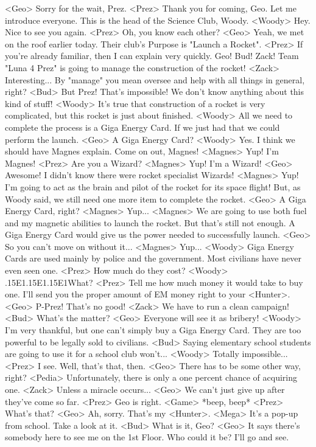 <Geo> Sorry for the wait, Prez. 
<Prez> Thank you for coming, Geo. 
Let me introduce everyone. This is the head of the Science Club, Woody. 
<Woody> Hey. Nice to see you again. 
<Prez> Oh, you know each other? 
<Geo> Yeah, we met on the roof earlier today. 
Their club's Purpose is "Launch a Rocket". 
<Prez> If you're already familiar, then I can explain very quickly. 
Geo! Bud! Zack! 
Team "Luna 4 Prez" is going to manage the construction of the rocket! 
<Zack> Interesting... 
By "manage" you mean oversee and help with all things in general, right? 
<Bud> But Prez! That's impossible! 
We don't know anything about this kind of stuff! 
<Woody> It's true that construction of a rocket is very 
complicated, but this rocket is just about finished. 
<Woody> All we need to complete the process is a Giga Energy Card. 
If we just had that we could perform the launch. 
<Geo> A Giga Energy Card? 
<Woody> Yes. I think we should have Magnes explain. 
Come on out, Magnes! 
<Magnes> Yup! I'm Magnes! 
<Prez> Are you a Wizard? 
<Magnes> Yup! I'm a Wizard! 
<Geo> Awesome! I didn't know there were rocket specialist Wizards! 
<Magnes> Yup! 
I'm going to act as the brain and pilot of the rocket for its space flight! 
But, as Woody said, we still need one more item to complete the rocket. 
<Geo> A Giga Energy Card, right? 
<Magnes> Yup... 
<Magnes> We are going to use both fuel and my magnetic 
abilities to launch the rocket. But that's still not enough. 
A Giga Energy Card would give us the power needed to successfully launch. 
<Geo> So you can't move on without it... 
<Magnes> Yup... 
<Woody> Giga Energy Cards are used mainly by police and the government. 
Most civilians have never even seen one. 
<Prez> How much do they cost? 
<Woody> .{15}{E1}.{15}{E1}.{15}{E1}What? 
<Prez> Tell me how much money it would take to buy one. 
I'll send you the proper amount of EM money right to your <Hunter>. 
<Geo> P-Prez! That's no good! 
<Zack> We have to run a clean campaign! 
<Bud> What's the matter? 
<Geo> Everyone will see it as bribery! 
<Woody> I'm very thankful, but one can't simply buy a Giga Energy Card. 
They are too powerful to be legally sold to civilians. 
<Bud> Saying elementary school students are going to use it for a school club won't... 
<Woody> Totally impossible... 
<Prez> I see. Well, that's that, then. 
<Geo> There has to be some other way, right? 
<Pedia> Unfortunately, there is only a one percent chance of acquiring one. 
<Zack> Unless a miracle occurs... 
<Geo> We can't just give up after they've come so far. 
<Prez> Geo is right. 
<Game> *beep, beep* 
<Prez> What's that? 
<Geo> Ah, sorry. That's my <Hunter>. 
<Mega> It's a pop-up from school. Take a look at it. 
<Bud> What is it, Geo? 
<Geo> It says there's somebody here to see me on the 1st Floor. 
Who could it be? I'll go and see. 
